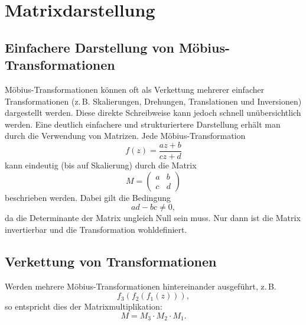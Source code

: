 %
%
%
%
\section{Matrixdarstellung
\label{moebius:section:teil5}}

\subsection{Einfachere Darstellung von Möbius-Transformationen}
Möbius-Transformationen können oft als Verkettung mehrerer einfacher Transformationen
(z.\,B. Skalierungen, Drehungen, Translationen und Inversionen) dargestellt werden.
Diese direkte Schreibweise kann jedoch schnell unübersichtlich werden.
Eine deutlich einfachere und strukturiertere Darstellung erhält man durch die Verwendung von Matrizen.
%
Jede Möbius-Transformation
\[
f(z) = \frac{az + b}{cz + d}
\]
kann eindeutig (bis auf Skalierung) durch die Matrix
\[
M = \begin{pmatrix} a & b \\ c & d \end{pmatrix}
\]
beschrieben werden.
Dabei gilt die Bedingung
\[
ad - bc \neq 0,
\]
da die Determinante der Matrix ungleich Null sein muss. Nur dann ist die Matrix invertierbar und die Transformation wohldefiniert.
%

\subsection{Verkettung von Transformationen}

Werden mehrere Möbius-Transformationen hintereinander ausgeführt, z.\,B.
\[
f_3(f_2(f_1(z))),
\]
so entspricht dies der Matrixmultiplikation:
\[
M = M_3 \cdot M_2 \cdot M_1.
\]

